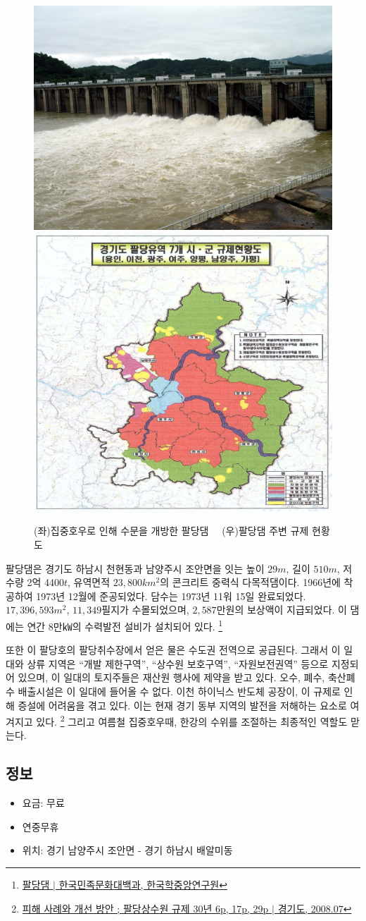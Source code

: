  
\begin{figure}[ht]
   \centering
   \includegraphics[width=.4\textwidth]{img/팔당댐.jpg}
   \includegraphics[width=.4\textwidth]{img/규제현황도.PNG}
    
   \caption{(좌)집중호우로 인해 수문을 개방한 팔당댐\protect\footnotemark $\quad$ (우)팔당댐 주변 규제 현황도\protect\footnotemark}
   \label{fig:my_labe9}
\end{figure}
\footnotetext{\ref{paldang}}


팔당댐은 경기도 하남시 천현동과 남양주시 조안면을 잇는
높이 $29m$, 길이 $510m$, 저수량 2억 4400$t$, 유역면적 $23,800km^2$의 콘크리트 중력식 다목적댐이다.
1966년에 착공하여 1973년 12월에 준공되었다.
담수는 1973년 11워 15일 완료되었다.
$17,396,593 m^2$, $11,349$필지가 수몰되었으며, $2,587$만원의 보상액이 지급되었다.
이 댐에는 연간 8만㎾의 수력발전 설비가 설치되어 있다.
\footnote{\href{https://terms.naver.com/entry.naver?docId=531161&cid=46631&categoryId=46631}{팔당댐 $|$ 한국민족문화대백과, 한국학중앙연구원}}


또한 이 팔당호의 팔당취수장에서 얻은 물은 수도권 전역으로 공급된다.
그래서 이 일대와 상류 지역은 ``개발 제한구역'', ``상수원 보호구역'', ``자원보전권역'' 
등으로 지정되어 있으며,
이 일대의 토지주들은 재산원 행사에 제약을 받고 있다.
오수, 폐수, 축산폐수 배출시설은 이 일대에 들어올 수 없다.
이천 하이닉스 반도체 공장이, 이 규제로 인해 증설에 어려움을 겪고 있다.
이는 현재 경기 동부 지역의 발전을 저해하는 요소로 여겨지고 있다.
\footnote{\label{paldang}\href{https://memory.library.kr/items/show/37492}{피해 사례와 개선 방안 ; 팔당상수원 규제 30년 6p, 17p, 29p $|$ 경기도, 2008.07}}
그리고 여름철 집중호우때, 한강의 수위를 조절하는 최종적인 역할도 맏는다.

\subsection{정보}
\begin{itemize}
    \item 요금: 무료
    \item 연중무휴
    \item 위치: 경기 남양주시 조안면 - 경기 하남시 배알미동
\end{itemize}